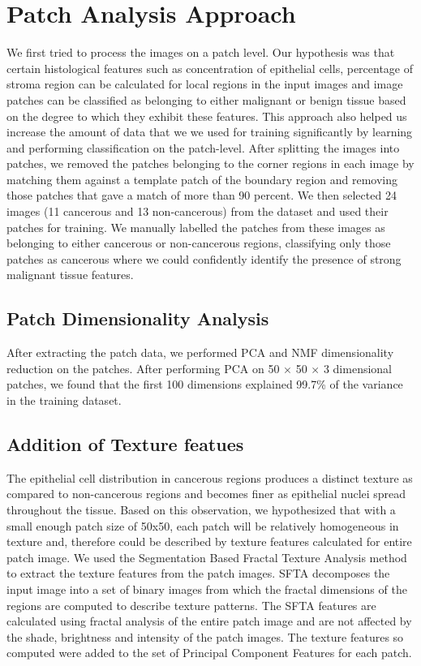 \section{Patch Analysis Approach}
\label{sec:patch_based_approaches}
We first tried to process the images on a patch level. Our hypothesis was that certain histological features such as concentration of epithelial cells, percentage of stroma region can be calculated for local regions in the input images and image patches can be classified as belonging to either malignant or benign tissue based on the degree to which they exhibit these features. This approach also helped us increase the amount of data that we we used for training significantly by learning and performing classification on the patch-level. After splitting the images into patches, we removed the patches belonging to the corner regions in each image by matching them against a template patch of the boundary region and removing those patches that gave a match of more than 90 percent. We then selected 24 images (11 cancerous and 13 non-cancerous) from the dataset and used their patches for training. We manually labelled the patches from these images as belonging to either cancerous or non-cancerous regions, classifying only those patches as cancerous where we could confidently identify the presence of strong malignant tissue features. 

\subsection{Patch Dimensionality Analysis}
After extracting the patch data, we performed PCA and NMF dimensionality reduction on the patches. After performing PCA on 50 $\times$ 50 $\times$ 3 dimensional patches, we found that the first 100 dimensions explained 99.7\% of the variance in the training dataset. 


\subsection{Addition of Texture featues}
The epithelial cell distribution in cancerous regions produces a distinct texture as compared to non-cancerous regions and becomes finer as epithelial nuclei spread throughout the tissue. Based on this observation, we hypothesized that with a small enough patch size of 50x50, each patch will be relatively homogeneous in texture and, therefore could be described by texture features calculated for entire patch image. We used the Segmentation Based Fractal Texture Analysis method \cite{6382737} to extract the texture features from the patch images. SFTA decomposes the input image into a set of binary images from  which the fractal dimensions of the regions are computed to describe texture patterns. The SFTA features are calculated using fractal analysis of the entire patch image and are not affected by the shade, brightness and intensity of the patch images. The texture features so computed were added to the set of Principal Component Features for each patch.



